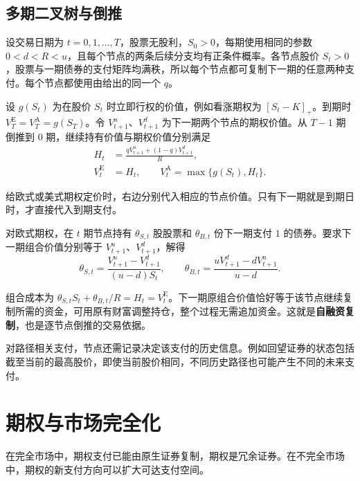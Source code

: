 \subsection{多期二叉树与倒推}\label{sec:wj-five-backward}
设交易日期为 $t=0,1,\ldots,T$，股票无股利，$S_0>0$，每期使用相同的参数 $0<d<R<u$，且每个节点的两条后续分支均有正条件概率。各节点股价 $S_t>0$，股票与一期债券的支付矩阵均满秩，所以每个节点都可复制下一期的任意两种支付。每个节点都使用由给出的同一个 $q$。
\begin{tcolorbox}[knowledge,title=逐节点定价与执行]
设 $g(S_t)$ 为在股价 $S_t$ 时立即行权的价值，例如看涨期权为 $[S_t-K]_+$。到期时 $V_T^{\mathrm E}=V_T^{\mathrm A}=g(S_T)$。令 $V_{t+1}^{u}$、$V_{t+1}^{d}$ 为下一期两个节点的期权价值。从 $T-1$ 期倒推到 0 期，继续持有价值与期权价值分别满足
\begin{equation}
 \begin{aligned}
 H_t&=\frac{qV_{t+1}^{u}+(1-q)V_{t+1}^{d}}R,\\
 V_t^{\mathrm E}&=H_t,\qquad
 V_t^{\mathrm A}=\max\{g(S_t),H_t\}.
 \end{aligned}
 \label{eq:wj-five-backward}
\end{equation}

给欧式或美式期权定价时，右边分别代入相应的节点价值。只有下一期就是到期日时，才直接代入到期支付。
\end{tcolorbox}
对欧式期权，在 $t$ 期节点持有 $\theta_{S,t}$ 股股票和 $\theta_{B,t}$ 份下一期支付 $1$ 的债券。要求下一期组合价值分别等于 $V_{t+1}^{u}$、$V_{t+1}^{d}$，解得
\[
 \theta_{S,t}=\frac{V_{t+1}^{u}-V_{t+1}^{d}}{(u-d)S_t},\qquad
 \theta_{B,t}=\frac{uV_{t+1}^{d}-dV_{t+1}^{u}}{u-d}.
\]
\begin{tcolorbox}[knowledge,title=自融资复制]
组合成本为 $\theta_{S,t}S_t+\theta_{B,t}/R=H_t=V_t^{\mathrm E}$。下一期原组合价值恰好等于该节点继续复制所需的资金，可用原有财富调整持仓，整个过程无需追加资金。这就是\textbf{自融资复制}，也是逐节点倒推的交易依据。
\end{tcolorbox}

对路径相关支付，节点还需记录决定该支付的历史信息。例如回望证券的状态包括截至当前的最高股价，即使当前股价相同，不同历史路径也可能产生不同的未来支付。

\section{期权与市场完全化}\label{sec:wj-five-completion}
在完全市场中，期权支付已能由原生证券复制，期权是冗余证券。在不完全市场中，期权的新支付方向可以扩大可达支付空间。

